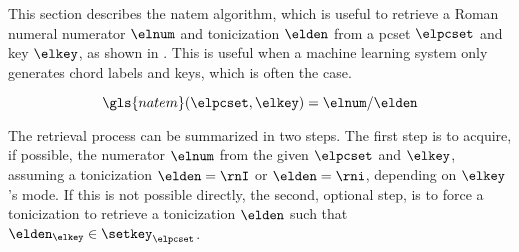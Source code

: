 
This section describes the \gls{natem} algorithm, which is
useful to retrieve a Roman numeral numerator $\elnum$ and
tonicization $\elden$ from a \gls{pcset} $\elpcset$ and key
$\elkey$, as shown in . This is useful when a
machine learning system only generates chord labels and
keys, which is often the case. 

\begin{equation}
    \label{eq:natem}
    \gls{natem}(\elpcset, \elkey) = \elnum\text{/}\elden
\end{equation}

The retrieval process can be summarized in two steps. The
first step is to acquire, if possible, the numerator
$\elnum$ from the given $\elpcset$ and $\elkey$, assuming a
tonicization $\elden = \rnI$ or $\elden = \rni$, depending
on $\elkey$'s mode. If this is not possible directly, the
second, optional step, is to force a tonicization to
retrieve a tonicization $\elden$ such that $\elden_\elkey
\in \setkey_\elpcset$.

